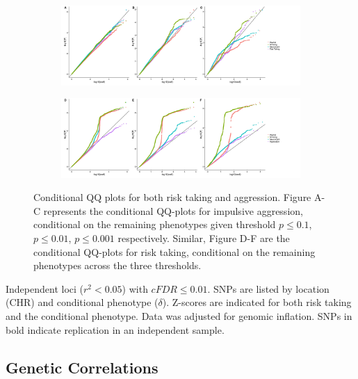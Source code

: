 \begin{figure}[!htpb]
  \centering
	\begin{subfigure}{1\textwidth}
		\centering
    \includegraphics[width=1\linewidth]{figure/cFDR/agg_cond.jpeg}
	\end{subfigure}
	\begin{subfigure}{1\textwidth}
		\centering
    \includegraphics[width=1\linewidth]{figure/cFDR/risk_cond.jpeg}
	\end{subfigure}
  \caption{
    Conditional QQ plots for both risk taking and aggression. 
    Figure A-C represents the conditional QQ-plots for impulsive aggression,
    conditional on the remaining phenotypes given threshold $p\leq0.1$, $p\leq0.01$, $p\leq0.001$ respectively.
    Similar, Figure D-F are the conditional QQ-plots for risk taking, conditional on the remaining phenotypes across the three thresholds.\label{fig:cFDR}}
\end{figure}


\begin{table}[htpb]
  
  \caption{
    Independent loci ($r^2 < 0.05$) with $cFDR\leq0.01$.
    SNPs are listed by location (CHR) and conditional phenotype ($\delta$).
    Z-scores are indicated for both risk taking and the conditional phenotype.
    Data was adjusted for genomic inflation.
    SNPs in bold indicate replication in an independent sample.
  }\label{tab:cFDR}
\end{table}

\subsection{Genetic Correlations}
\label{sub:genetic_correlations_internal}

